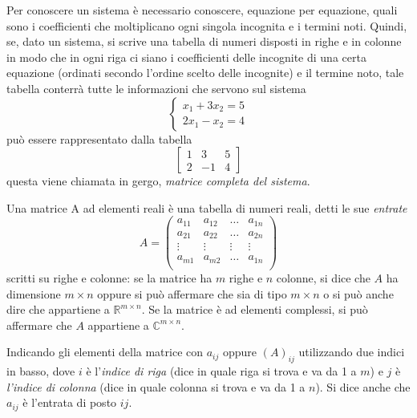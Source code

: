 Per conoscere un sistema è necessario conoscere, equazione per equazione,
quali sono i coefficienti che moltiplicano ogni singola incognita e i
termini noti. Quindi, se, dato un sistema, si scrive una tabella di
numeri disposti in righe e in colonne in modo che in ogni riga ci siano
i coefficienti delle incognite di una certa equazione (ordinati secondo
l'ordine scelto delle incognite) e il termine noto, tale tabella conterrà
tutte le informazioni che servono sul sistema
\begin{equation}
  \label{eq:matricediunsistlineare1}
  \begin{cases}
    x_1+3x_2=5\\
    2x_1-x_2=4
  \end{cases}
\end{equation}
può essere rappresentato dalla tabella
\begin{equation}
  \label{eq:matricediunsistlineare2}
  \begin{bmatrix}
    1 & 3 & 5\\
    2 & -1 & 4
  \end{bmatrix}
\end{equation}
questa viene chiamata in gergo, \textit{matrice completa del sistema}.
\begin{defi}
  \label{defi:matrice1}
  Una matrice A ad elementi reali è una tabella di numeri reali, detti le
  sue \textit{entrate}
  \begin{equation*}
    A=
    \begin{pmatrix}
      a_{11} & a_{12} & \dots & a_{1n}\\
      a_{21} & a_{22} & \dots & a_{2n}\\
      \vdots & \vdots & \vdots & \vdots\\
      a_{m1} & a_{m2} & \dots & a_{1n}\\
    \end{pmatrix}
  \end{equation*}
  scritti su righe e colonne: se la matrice ha $m$ righe e $n$ colonne,
  si dice che $A$ ha dimensione $m \times n$ oppure si può affermare che
  sia di tipo $m \times n$ o si può anche dire che appartiene a
  $\mathds{R}^{m \times n}$. Se la matrice è ad elementi complessi, si può
  affermare che $A$ appartiene a $\mathds{C}^{m \times n}$.

  Indicando gli elementi della matrice con $a_{ij}$ oppure $(A)_{ij}$
  utilizzando due indici in basso, dove $i$ è l'\textit{indice di riga}
  (dice in quale riga si trova e va da 1 a $m$) e $j$ è \textit{l'indice
    di colonna} (dice in quale colonna si trova e va da 1 a $n$). Si dice
  anche che $a_{ij}$ è l'entrata di posto $ij$.
\end{defi}
